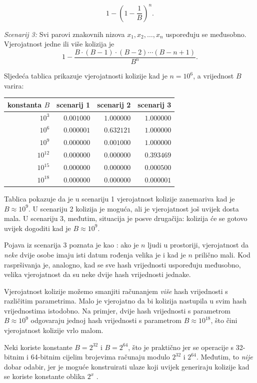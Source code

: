 \[1-(1-\frac{1}{B})^n.\]

\textit{Scenarij 3:} Svi parovi znakovnih nizova $x_1,x_2,\ldots,x_n$
uspoređuju se međusobno.
Vjerojatnost jedne ili više kolizija je
\[ 1 - \frac{B \cdot (B-1) \cdot (B-2) \cdots (B-n+1)}{B^n}.\]

Sljedeća tablica prikazuje vjerojatnosti kolizije
kad je $n=10^6$, a vrijednost $B$ varira:

\begin{center}
\begin{tabular}{rrrr}
konstanta $B$ & scenarij 1 & scenarij 2 & scenarij 3 \\
\hline
$10^3$ & $0.001000$ & $1.000000$ & $1.000000$ \\
$10^6$ & $0.000001$ & $0.632121$ & $1.000000$ \\
$10^9$ & $0.000000$ & $0.001000$ & $1.000000$ \\
$10^{12}$ & $0.000000$ & $0.000000$ & $0.393469$ \\
$10^{15}$ & $0.000000$ & $0.000000$ & $0.000500$ \\
$10^{18}$ & $0.000000$ & $0.000000$ & $0.000001$ \\
\end{tabular}
\end{center}

Tablica pokazuje da je u scenariju 1
vjerojatnost kolizije zanemariva
kad je $B \approx 10^9$.
U scenariju 2 kolizija je moguća, ali je
vjerojatnost još uvijek dosta mala.
U scenariju 3, međutim, situacija je posve drugačija:
kolizija će se gotovo uvijek dogoditi kad je
$B \approx 10^9$.


Pojava iz scenarija 3 poznata je kao
: ako je $n$ ljudi
u prostoriji, vjerojatnost da \emph{neke} dvije osobe
imaju isti datum rođenja velika je i kad je $n$ prilično mali.
Kod raspršivanja je, analogno, kad se sve hash vrijednosti
uspoređuju međusobno, velika vjerojatnost da su neke dvije
hash vrijednosti jednake.

Vjerojatnost kolizije možemo smanjiti
računanjem \emph{više} hash vrijednosti
s različitim parametrima.
Malo je vjerojatno da bi kolizija nastupila
u svim hash vrijednostima istodobno.
Na primjer, dvije hash vrijednosti s parametrom
$B \approx 10^9$ odgovaraju jednoj hash
vrijednosti s parametrom $B \approx 10^{18}$,
što čini vjerojatnost kolizije vrlo malom.

Neki koriste konstante $B=2^{32}$ i $B=2^{64}$,
što je praktično jer se operacije s 32-bitnim i 64-bitnim
cijelim brojevima računaju modulo $2^{32}$ i $2^{64}$.
Međutim, to \emph{nije} dobar odabir, jer je moguće
konstruirati ulaze koji uvijek generiraju kolizije kad se
koriste konstante oblika $2^x$ \cite{pac13}.

